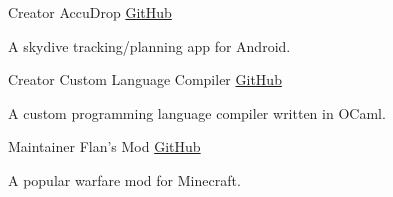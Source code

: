 






\begin{cventries}

  \cventry
    {Creator} %
    {AccuDrop} %
    {\href{https://github.com/ChrisLane/accudrop}{GitHub}} %
    {} %
    {
      \begin{cvitems} %
      \item {A skydive tracking/planning app for Android.}
      \end{cvitems}
    }

  \cventry
    {Creator} %
    {Custom Language Compiler} %
    {\href{https://github.com/ChrisLane/custom-lang-compiler}{GitHub}} %
    {} %
    {
      \begin{cvitems} %
      \item {A custom programming language compiler written in OCaml.}
      \end{cvitems}
    }

  \cventry
    {Maintainer} %
    {Flan's Mod} %
    {\href{https://github.com/FlansMods/FlansMod}{GitHub}} %
    {} %
    {
      \begin{cvitems} %
      \item {A popular warfare mod for Minecraft.}
      \end{cvitems}
    }


\end{cventries}
